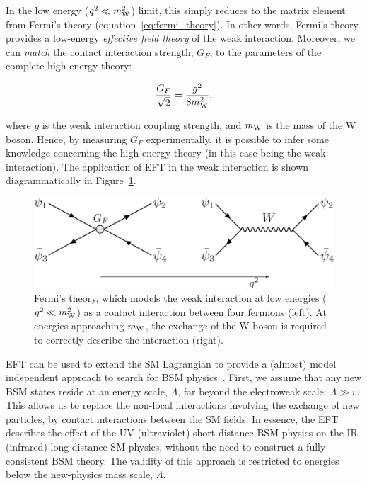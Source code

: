 \noindent
In the low energy ($q^2 \ll m_{\rm{W}}^2$) limit, this simply reduces to the matrix element from Fermi's theory (equation~\ref{eq:fermi_theory}). In other words, Fermi's theory provides a low-energy \textit{effective field theory} of the weak interaction. Moreover, we can \textit{match} the contact interaction strength, $G_F$, to the parameters of the complete high-energy theory:

\begin{equation}
    \frac{G_F}{\sqrt{2}} = \frac{g^2}{8m_{\rm{W}}^2},
\end{equation}

\noindent
where $g$ is the weak interaction coupling strength, and $m_{\rm{W}}$ is the mass of the W boson. Hence, by measuring $G_F$ experimentally, it is possible to infer some knowledge concerning the high-energy theory (in this case being the weak interaction). The application of EFT in the weak interaction is shown diagrammatically in Figure~\ref{fig:fermi_theory}.

\begin{figure}
  \centering
  \includegraphics[width=.8\linewidth]{Figures/theory/fermi_theory.pdf}
  \caption[Fermi's theory of the weak interaction]
  {
    Fermi's theory, which models the weak interaction at low energies ($q^2 \ll m_{\rm{W}}^2$) as a contact interaction between four fermions (left). At energies approaching $m_{\rm{W}}$, the exchange of the W boson is required to correctly describe the interaction (right).
  }
  \label{fig:fermi_theory}
\end{figure}

EFT can be used to extend the SM Lagrangian to provide a (almost) model independent approach to search for BSM physics~\cite{Brivio:2017vri}. First, we assume that any new BSM states reside at an energy scale, $\Lambda$, far beyond the electroweak scale: $\Lambda \gg v$. This allows us to replace the non-local interactions involving the exchange of new particles, by contact interactions between the SM fields. In essence, the EFT describes the effect of the UV (ultraviolet) short-distance BSM physics on the IR (infrared) long-distance SM physics, without the need to construct a fully consistent BSM theory. The validity of this approach is restricted to energies below the new-physics mass scale, $\Lambda$.

